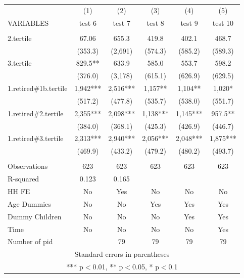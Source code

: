 \begin{tabular}{lccccc} \hline
 & (1) & (2) & (3) & (4) & (5) \\
VARIABLES & test 6 & test 7 & test 8 & test 9 & test 10 \\ \hline
 &  &  &  &  &  \\
2.tertile & 67.06 & 655.3 & 419.8 & 402.1 & 468.7 \\
 & (353.3) & (2,691) & (574.3) & (585.2) & (589.3) \\
3.tertile & 829.5** & 633.9 & 585.0 & 553.7 & 598.2 \\
 & (376.0) & (3,178) & (615.1) & (626.9) & (629.5) \\
1.retired\#1b.tertile & 1,942*** & 2,516*** & 1,157** & 1,104** & 1,020* \\
 & (517.2) & (477.8) & (535.7) & (538.0) & (551.7) \\
1.retired\#2.tertile & 2,355*** & 2,098*** & 1,138*** & 1,145*** & 957.5** \\
 & (384.0) & (368.1) & (425.3) & (426.9) & (446.7) \\
1.retired\#3.tertile & 2,313*** & 2,940*** & 2,056*** & 2,048*** & 1,875*** \\
 & (469.9) & (433.2) & (479.2) & (480.2) & (493.7) \\
 &  &  &  &  &  \\
Observations & 623 & 623 & 623 & 623 & 623 \\
R-squared & 0.123 & 0.165 &  &  &  \\
HH FE & No & Yes & No & No & No \\
Age Dummies & No & No & Yes & Yes & Yes \\
Dummy Children & No & No & No & Yes & Yes \\
Time & No & No & No & No & Yes \\
 Number of pid &  & 79 & 79 & 79 & 79 \\ \hline
\multicolumn{6}{c}{ Standard errors in parentheses} \\
\multicolumn{6}{c}{ *** p$<$0.01, ** p$<$0.05, * p$<$0.1} \\
\end{tabular}
